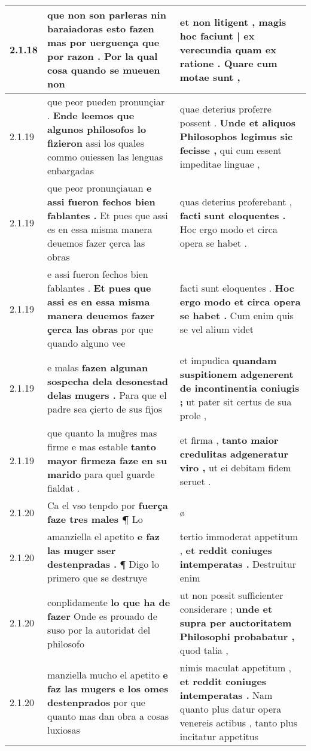\begin{tabular}{|p{1cm}|p{6.5cm}|p{6.5cm}|}
2.1.18 & que non son parleras nin baraiadoras \textbf{ esto fazen mas por uerguença que por razon . } Por la qual cosa quando se mueuen non & et non litigent , \textbf{ magis hoc faciunt | ex verecundia quam ex ratione . } Quare cum motae sunt , \\\hline
2.1.19 & que peor pueden pronunçiar . \textbf{ Ende leemos que algunos philosofos lo fizieron } assi los quales commo ouiessen las lenguas enbargadas & quae deterius proferre possent . \textbf{ Unde et aliquos Philosophos legimus sic fecisse , } qui cum essent impeditae linguae , \\\hline
2.1.19 & que peor pronunçiauan \textbf{ e assi fueron fechos bien fablantes . } Et pues que assi es en essa misma manera deuemos fazer çerca las obras & quas deterius proferebant , \textbf{ facti sunt eloquentes . } Hoc ergo modo et circa opera se habet . \\\hline
2.1.19 & e assi fueron fechos bien fablantes . \textbf{ Et pues que assi es en essa misma manera deuemos fazer çerca las obras } por que quando alguno vee & facti sunt eloquentes . \textbf{ Hoc ergo modo et circa opera se habet . } Cum enim quis se vel alium videt \\\hline
2.1.19 & e malas \textbf{ fazen algunan sospecha dela desonestad delas mugers . } Para que el padre sea çierto de sus fijos & et impudica \textbf{ quandam suspitionem adgenerent de incontinentia coniugis ; } ut pater sit certus de sua prole , \\\hline
2.1.19 & que quanto la mug̃res mas firme e mas estable \textbf{ tanto mayor firmeza faze en su marido } para quel guarde fialdat . & et firma , \textbf{ tanto maior credulitas adgeneratur viro , } ut ei debitam fidem seruet . \\\hline
2.1.20 & Ca el vso tenpdo por \textbf{ fuerça faze tres males ¶ } Lo & ø \\\hline
2.1.20 & amanziella el apetito \textbf{ e faz las muger sser destenpradas . } ¶ Digo lo primero que se destruye & tertio immoderat appetitum , \textbf{ et reddit coniuges intemperatas . } Destruitur enim \\\hline
2.1.20 & conplidamente \textbf{ lo que ha de fazer } Onde es prouado de suso por la autoridat del philosofo & ut non possit sufficienter considerare ; \textbf{ unde et supra per auctoritatem Philosophi probabatur , } quod talia , \\\hline
2.1.20 & manziella mucho el apetito \textbf{ e faz las mugers e los omes destenprados } por que quanto mas dan obra a cosas luxiosas & nimis maculat appetitum , \textbf{ et reddit coniuges intemperatas . } Nam quanto plus datur opera venereis actibus , tanto plus incitatur appetitus \\\hline

\end{tabular}
